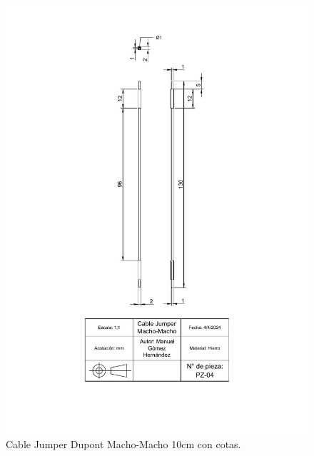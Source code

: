     \begin{figure}[H]
        \centering
        \includegraphics[scale=0.4]{15/img/cableJumperMMTrazo.pdf}
        \caption{Cable Jumper Dupont Macho-Macho 10cm con cotas.}
        \label{fig:cableJumperMMTrazo}
    \end{figure}
    
